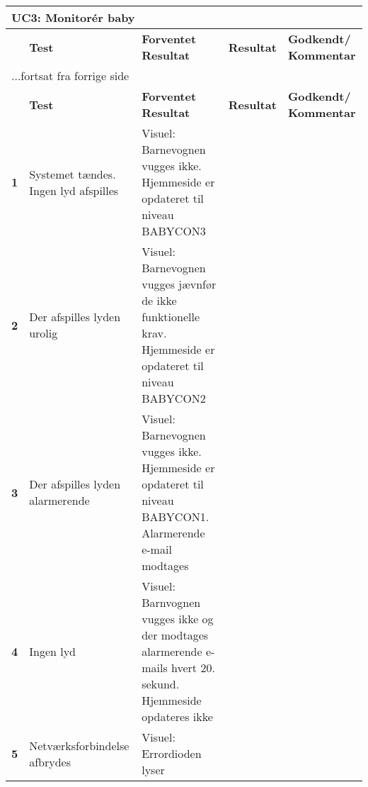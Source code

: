 \begin{center}
	\label{accepttest:uc3} 
\begin{longtable}{|p{}|p{}|p{}|p{}|p{}|} %
\hline
\multicolumn{5}{|l|}{\textbf{UC3: Monitorér baby}} \\ \hline
\multicolumn{1}{|c|}{} &
\textbf{Test} &
\textbf{Forventet \newline Resultat} &
\textbf{Resultat} &
\textbf{Godkendt/ \newline Kommentar} \\ \hline 
\endfirsthead

\multicolumn{5}{l}{...fortsat fra forrige side} \\ \hline 
\multicolumn{1}{|c|}{} &
\textbf{Test} &
\textbf{Forventet \newline Resultat} &
\textbf{Resultat} &
\textbf{Godkendt/ \newline Kommentar} \\ \hline 
\endhead



\textbf{1}	&Systemet tændes. Ingen lyd afspilles
			&Visuel: Barnevognen vugges ikke. Hjemmeside er opdateret til niveau BABYCON3
			&
			& 
			\\\hline

\textbf{2}	&Der afspilles lyden urolig
			&Visuel: Barnevognen vugges jævnfør de ikke funktionelle krav. Hjemmeside er opdateret til niveau BABYCON2
			&
			&
			\\\hline
			 
\textbf{3}	&Der afspilles lyden alarmerende
			&Visuel: Barnevognen vugges ikke. Hjemmeside er opdateret til niveau BABYCON1. Alarmerende e-mail modtages
			&
			&
			\\\hline
			
\textbf{4}	&Ingen lyd
			&Visuel: Barnvognen vugges ikke og der modtages alarmerende e-mails hvert 20. sekund. Hjemmeside opdateres ikke
			&
			&
			\\\hline

\textbf{5}  &Netværksforbindelse afbrydes
			&Visuel: Errordioden lyser
			&
			&
			\\\hline			
			
\end{longtable}
\end{center}